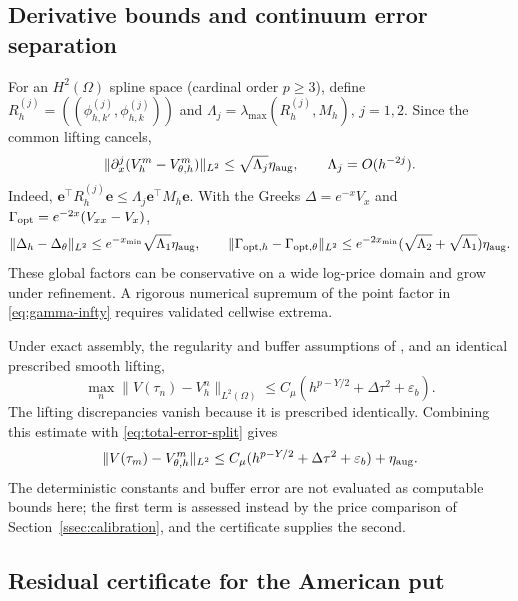 \documentclass[11pt]{amsart}
\theoremstyle{remark}
\newcommand{\Mh}{M_h}
\newcommand{\dt}{\Delta\tau}
\newcommand{\ee}{\mathbf e}
\begin{document}
\subsection{Derivative bounds and continuum error separation}
\label{ssec:derivatives}\label{ssec:total-error}
For an $H^2(\Omega)$ spline space (cardinal order $p\ge3$), define
$R_h^{(j)}=((\phi_{h,k'}^{(j)},\phi_{h,k}^{(j)}))$ and
$\Lambda_j=\lambda_{\max}(R_h^{(j)},\Mh)$, $j=1,2$.
Since the common lifting cancels,
\[
 \|\partial_x^j(V_h^m-V_{\theta,h}^m)\|_{L^2}
 \le\sqrt{\Lambda_j}\eta_{\rm aug},
 \qquad \Lambda_j=O(h^{-2j}).
\]
Indeed, $\ee^\top R_h^{(j)}\ee\le\Lambda_j\ee^\top\Mh\ee$.
With the Greeks $\Delta=e^{-x}V_x$ and $\Gamma_{\rm opt}=e^{-2x}(V_{xx}-V_x)$,
\[
 \|\Delta_h-\Delta_\theta\|_{L^2}
 \le e^{-x_{\min}}\sqrt{\Lambda_1}\eta_{\rm aug},\qquad
 \|\Gamma_{{\rm opt},h}-\Gamma_{{\rm opt},\theta}\|_{L^2}
 \le e^{-2x_{\min}}(\sqrt{\Lambda_2}+\sqrt{\Lambda_1})\eta_{\rm aug}.
\]
These global factors can be conservative on a wide log-price domain and
grow under refinement. A rigorous numerical supremum of the point factor
in \eqref{eq:gamma-infty} requires validated cellwise extrema.

Under exact assembly, the regularity and buffer assumptions of
\cite{DamircheliCGMY2026}, and an identical prescribed smooth lifting,
\begin{equation}
 \max_n\|V(\tau_n)-V_h^n\|_{L^2(\Omega)}
 \le C_\mu(h^{p-Y/2}+\dt^2+\varepsilon_b).
 \label{eq:deterministic-error}
\end{equation}
The lifting discrepancies vanish because it is prescribed identically.
Combining this estimate with \eqref{eq:total-error-split} gives
\[
 \|V(\tau_m)-V_{\theta,h}^m\|_{L^2}
 \le C_\mu(h^{p-Y/2}+\dt^2+\varepsilon_b)+\eta_{\rm aug}.
\]
The deterministic constants and buffer error are not evaluated as
computable bounds here; the first term is assessed instead by the price comparison of
Section~\ref{ssec:calibration}, and the certificate supplies the second.

\subsection{Residual certificate for the American put}
\label{ssec:vi}

\end{document}
